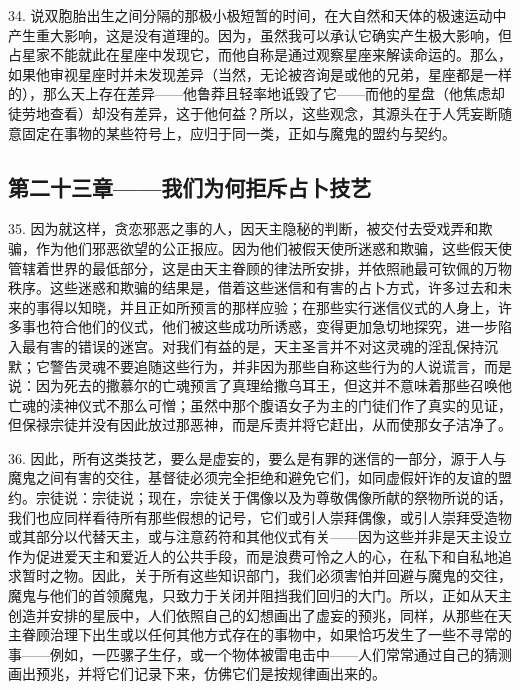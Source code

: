34. 说双胞胎出生之间分隔的那极小极短暂的时间，在大自然和天体的极速运动中产生重大影响，这是没有道理的。因为，虽然我可以承认它确实产生极大影响，但占星家不能就此在星座中发现它，而他自称是通过观察星座来解读命运的。那么，如果他审视星座时并未发现差异（当然，无论被咨询是或他的兄弟，星座都是一样的），那么天上存在差异——他鲁莽且轻率地诋毁了它——而他的星盘（他焦虑却徒劳地查看）却没有差异，这于他何益？所以，这些观念，其源头在于人凭妄断随意固定在事物的某些符号上，应归于同一类，正如与魔鬼的盟约与契约。\par


\subsection{第二十三章——我们为何拒斥占卜技艺}

35. 因为就这样，贪恋邪恶之事的人，因天主隐秘的判断，被交付去受戏弄和欺骗，作为他们邪恶欲望的公正报应。因为他们被假天使所迷惑和欺骗，这些假天使管辖着世界的最低部分，这是由天主眷顾的律法所安排，并依照祂最可钦佩的万物秩序。这些迷惑和欺骗的结果是，借着这些迷信和有害的占卜方式，许多过去和未来的事得以知晓，并且正如所预言的那样应验；在那些实行迷信仪式的人身上，许多事也符合他们的仪式，他们被这些成功所诱惑，变得更加急切地探究，进一步陷入最有害的错误的迷宫。对我们有益的是，天主圣言并不对这灵魂的淫乱保持沉默；它警告灵魂不要追随这些行为，并非因为那些自称这些行为的人说谎言，而是说：因为死去的撒慕尔的亡魂预言了真理给撒乌耳王，但这并不意味着那些召唤他亡魂的渎神仪式不那么可憎；虽然中那个腹语女子为主的门徒们作了真实的见证，但保禄宗徒并没有因此放过那恶神，而是斥责并将它赶出，从而使那女子洁净了。\par

36. 因此，所有这类技艺，要么是虚妄的，要么是有罪的迷信的一部分，源于人与魔鬼之间有害的交往，基督徒必须完全拒绝和避免它们，如同虚假奸诈的友谊的盟约。宗徒说：宗徒说；现在，宗徒关于偶像以及为尊敬偶像所献的祭物所说的话，我们也应同样看待所有那些假想的记号，它们或引人崇拜偶像，或引人崇拜受造物或其部分以代替天主，或与注意药符和其他仪式有关——因为这些并非是天主设立作为促进爱天主和爱近人的公共手段，而是浪费可怜之人的心，在私下和自私地追求暂时之物。因此，关于所有这些知识部门，我们必须害怕并回避与魔鬼的交往，魔鬼与他们的首领魔鬼，只致力于关闭并阻挡我们回归的大门。所以，正如从天主创造并安排的星辰中，人们依照自己的幻想画出了虚妄的预兆，同样，从那些在天主眷顾治理下出生或以任何其他方式存在的事物中，如果恰巧发生了一些不寻常的事——例如，一匹骡子生仔，或一个物体被雷电击中——人们常常通过自己的猜测画出预兆，并将它们记录下来，仿佛它们是按规律画出来的。\par

